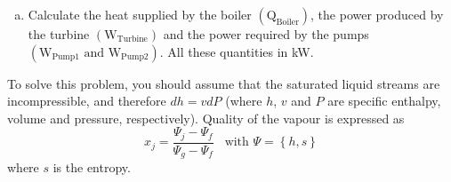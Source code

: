 \documentclass[calculator,steamtables,refrigeranttables,psychrometricchart,datasheet,resit]{exam}
\newcommand{\frc}{\displaystyle\frac}
\begin{document}
\begin{question}
\begin{enumerate}[(a)]
\item Calculate the heat supplied by the boiler $\left(\text{Q}_{\text{Boiler}}\right)$, the power produced by the turbine $\left(\text{W}_{\text{Turbine}}\right)$ and the power required by the pumps $\left(\text{W}_{\text{Pump1}}\text{ and W}_{\text{Pump2}}\right)$. All these quantities in kW.~
\end{enumerate}

To solve this problem, you should assume that the saturated liquid streams are incompressible, and therefore $dh = vdP$ (where $h$, $v$ and $P$ are specific enthalpy, volume and pressure, respectively). Quality of the vapour is expressed as
\begin{displaymath}
x_{j} = \frc{\Psi_{j}-\Psi_{f}}{\Psi_{g}-\Psi_{f}}\;\;\;\text{with }\Psi=\left\{h,s\right\}
\end{displaymath}
where $s$ is the entropy.


\end{question}



\paperend

{
  
  
  
}
\end{document}
